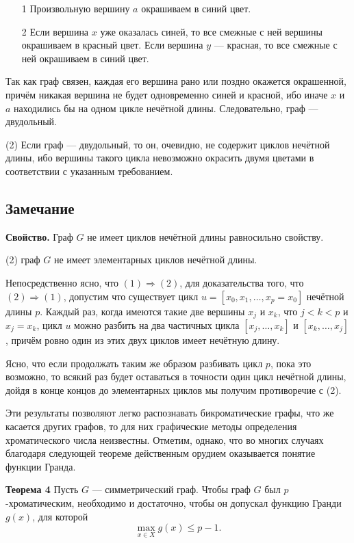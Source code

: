 \begin{enumerate}
    \item[1\textdegree] Произвольную вершину \( a \) окрашиваем в синий цвет.
    \item[2\textdegree] Если вершина \( x \) уже оказалась синей, то все смежные с ней вершины окрашиваем в красный цвет. Если вершина \( y \) — красная, то все смежные с ней окрашиваем в синий цвет.
\end{enumerate}

Так как граф связен, каждая его вершина рано или поздно окажется окрашенной, причём никакая вершина не будет одновременно синей и красной, ибо иначе \( x \) и \( a \) находились бы на одном цикле нечётной длины. Следовательно, граф — двудольный.

(2) Если граф — двудольный, то он, очевидно, не содержит циклов нечётной длины, ибо вершины такого цикла невозможно окрасить двумя цветами в соответствии с указанным требованием.

\subsection*{Замечание}

\textbf{Свойство.} Граф \( G \) не имеет циклов нечётной длины равносильно свойству.

(2) граф \( G \) не имеет элементарных циклов нечётной длины.

Непосредственно ясно, что \((1) \Rightarrow (2)\), для доказательства того, что \((2) \Rightarrow (1)\), допустим что существует цикл \( u = [x_0, x_1, \ldots, x_p = x_0] \) нечётной длины \( p \). Каждый раз, когда имеются такие две вершины \( x_j \) и \( x_k \), что \( j < k < p \) и \( x_j = x_k \), цикл \( u \) можно разбить на два частичных цикла \([x_j, \ldots, x_k]\) и \([x_k, \ldots, x_j]\), причём ровно один из этих двух циклов имеет нечётную длину.

Ясно, что если продолжать таким же образом разбивать цикл \( p \), пока это возможно, то всякий раз будет оставаться в точности один цикл нечётной длины, дойдя в конце концов до элементарных циклов мы получим противоречие с (2).

Эти результаты позволяют легко распознавать бикроматические графы, что же касается других графов, то для них графические методы определения хроматического числа неизвестны. Отметим, однако, что во многих случаях благодаря следующей теореме действенным орудием оказывается понятие функции Гранда.

\textbf{Теорема 4} Пусть \( G \) — симметрический граф. Чтобы граф \( G \) был \( p \)-хроматическим, необходимо и достаточно, чтобы он допускал функцию Гранди \( g(x) \), для которой
\[
\max_{x \in X} g(x) \leq p - 1.
\]

